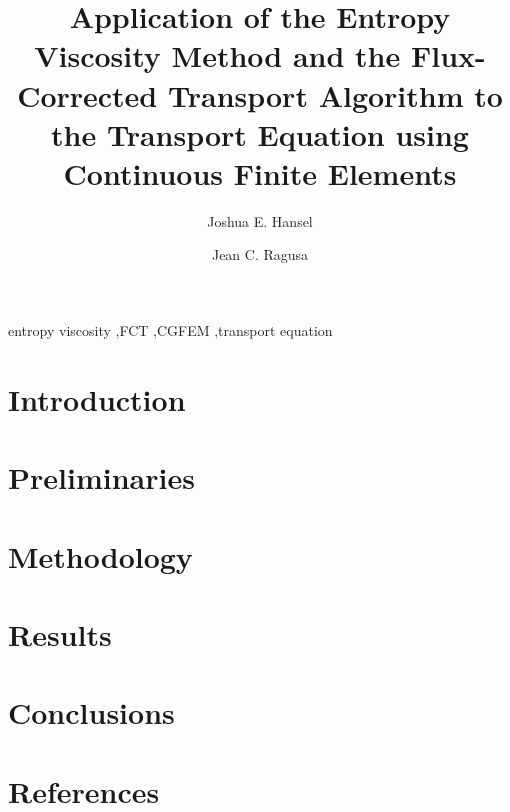 \documentclass{elsarticle}
\begin{document}
\begin{frontmatter}


\title{Application of the Entropy Viscosity Method and the Flux-Corrected Transport
  Algorithm to the Transport Equation using Continuous Finite Elements}

\author[tamu]{Joshua E. Hansel}

\author[tamu]{Jean C. Ragusa}

\address[tamu]{Texas A\&M University,
  400 Bizzell St,
  College Station, TX 77840}



\begin{keyword}
entropy viscosity \sep FCT \sep CGFEM \sep transport equation
\end{keyword}

\end{frontmatter}

\section{Introduction}


\section{Preliminaries}


\section{Methodology}


\section{Results}


\section{Conclusions}


\section*{References}


\end{document}

